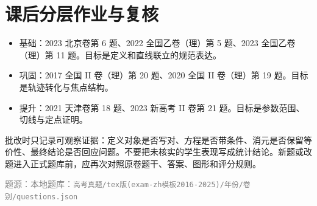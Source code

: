\documentclass[UTF8,a4paper,11pt]{ctexart}
\newcommand{\source}[1]{\par\smallskip\noindent\textcolor{gray}{\footnotesize 题源：#1}\par}
\begin{document}
\section*{课后分层作业与复核}
\begin{itemize}
  \item 基础：2023 北京卷第 6 题、2022 全国乙卷（理）第 5 题、2023 全国乙卷（理）第 11 题。目标是定义和直线联立的规范表达。
  \item 巩固：2017 全国 II 卷（理）第 20 题、2020 全国 II 卷（理）第 19 题。目标是轨迹转化与焦点结构。
  \item 提升：2021 天津卷第 18 题、2023 新高考 II 卷第 21 题。目标是参数范围、切线与定点证明。
\end{itemize}

批改时只记录可观察证据：定义对象是否写对、方程是否带条件、消元是否保留等价性、最终结论是否回应问题。不要把未核实的学生表现写成统计结论。新题或改题进入正式题库前，应再次对照原卷题干、答案、图形和评分规则。

\source{本地题库：\texttt{高考真题/tex版(exam-zh模板2016-2025)/年份/卷别/questions.json}}
\end{document}
